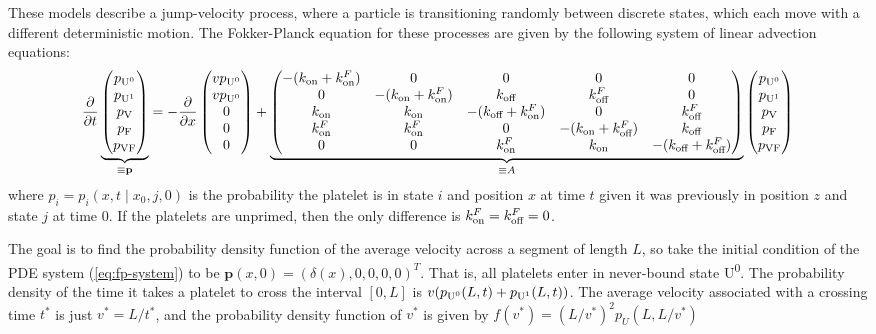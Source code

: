 \documentclass{article}
\newcommand{\tn}{\textnormal}
\newcommand{\Pder}[2]{\frac{\partial #1}{\partial #2}}
\begin{document}
These models describe a jump-velocity process, where a particle is
transitioning randomly between discrete states, which each move with a
different deterministic motion. The Fokker-Planck equation for these
processes are given by the following system of linear advection
equations:
\begin{equation}
  \label{eq:fp-system}
  \Pder{}{t}
  \underbrace{
    \begin{pmatrix}
      p_{\tn{U}^0} \\ p_{\tn{U}^1} \\ p_\tn{V} \\ p_\tn{F} \\ p_\tn{VF}
    \end{pmatrix}}_{\equiv \mathbf{p}}
  =
  -\Pder{}{x}
  \begin{pmatrix}
    v p_{\tn{U}^0} \\ v p_{\tn{U}^0} \\ 0 \\ 0 \\ 0
  \end{pmatrix}
  +
  \underbrace{
    \begin{pmatrix}
      -(k_\tn{on} + k_\tn{on}^F) & 0 & 0 & 0 & 0 \\
      0 & -(k_\tn{on} + k_\tn{on}^F) & k_\tn{off} & k_\tn{off}^F & 0 \\
      k_\tn{on} & k_\tn{on} & -(k_\tn{off} + k_\tn{on}^F) & 0 & k_\tn{off}^F \\
      k_\tn{on}^F & k_\tn{on}^F & 0 & -(k_\tn{on} + k_\tn{off}^F) & k_\tn{off} \\
      0 & 0 & k_\tn{on}^F & k_\tn{on} & -(k_\tn{off} + k_\tn{off}^F)
  \end{pmatrix}}_{\equiv A}
  \begin{pmatrix}
    p_{\tn{U}^0} \\ p_{\tn{U}^1} \\ p_\tn{V} \\ p_\tn{F} \\ p_\tn{VF}
  \end{pmatrix}
\end{equation}
where $p_i = p_i(x, t \mid x_0, j, 0)$ is the probability the platelet
is in state $i$ and position $x$ at time $t$ given it was previously
in position $z$ and state $j$ at time $0$. If the platelets are
unprimed, then the only difference is $k_\tn{on}^F = k_\tn{off}^F =
0$.

The goal is to find the probability density function of the average
velocity across a segment of length $L$, so take the initial condition
of the PDE system (\ref{eq:fp-system}) to be
$\mathbf{p}(x, 0) = (\delta(x), 0, 0, 0, 0)^T$. That is, all platelets
enter in never-bound state U\textsuperscript{0}. The probability
density of the time it takes a platelet to cross the interval $[0, L]$
is $v(p_{\tn{U}^0}(L, t) + p_{\tn{U}^1}(L,t))$. The average velocity
associated with a crossing time $t^*$ is just $v^* = L/t^*$, and the
probability density function of $v^*$ is given by
$f(v^*) = (L/v^*)^2 p_U(L, L/v^*)$
\end{document}
